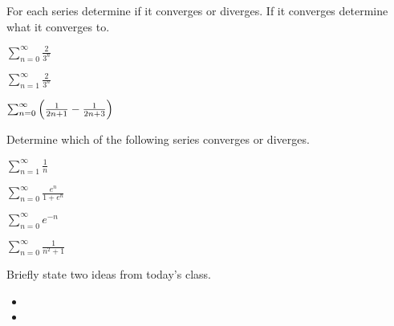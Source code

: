 
\begin{problem}
\item For each series determine if it converges or diverges. If it
  converges determine what it converges to.
  \begin{subproblem}
  \item $\sum_{n=0}^\infty \frac{2}{3^n}$
    \vfill
  \item $\sum_{n=1}^\infty \frac{2}{3^n}$
    \vfill
  \item $\sum_{n=0}^\infty \left( \frac{1}{2n+1}-\frac{1}{2n+3} \right)$
    \vfill
  \end{subproblem}
\end{problem}


\begin{problem}
\item Determine which of the following series converges or
  diverges. 
  \begin{subproblem}
    \item $\sum_{n=1}^\infty \frac{1}{n}$
      \vfill
    \item $\sum_{n=0}^\infty \frac{e^n}{1+e^n}$
      \vfill
    \item $\sum_{n=0}^\infty e^{-n}$
      \vfill
    \item $\sum_{n=0}^\infty \frac{1}{n^2+1}$
      \vfill
  \end{subproblem}
\end{problem}


\postClass

\begin{problem}
\item Briefly state two ideas from today's class.
  \begin{itemize}
  \item 
  \item 
  \end{itemize}
\item 
  \begin{subproblem}
    \item
  \end{subproblem}
\end{problem}


